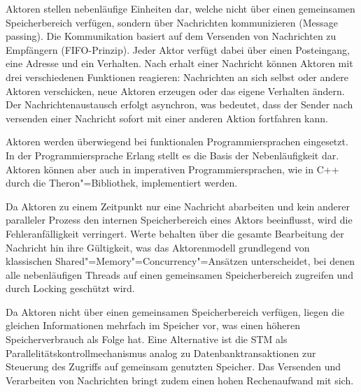 Aktoren stellen nebenläufige Einheiten dar, welche nicht über einen gemeinsamen Speicherbereich verfügen, sondern über Nachrichten kommunizieren (Message passing).
Die Kommunikation basiert auf dem Versenden von Nachrichten zu Empfängern (FIFO-Prinzip).
Jeder Aktor verfügt dabei über einen Posteingang, eine Adresse und ein Verhalten.
Nach erhalt einer Nachricht können Aktoren mit drei verschiedenen Funktionen reagieren:
Nachrichten an sich selbst oder andere Aktoren verschicken, neue Aktoren erzeugen oder das eigene Verhalten ändern.
Der Nachrichtenaustausch erfolgt asynchron, was bedeutet, dass der Sender nach versenden einer Nachricht sofort mit einer anderen Aktion fortfahren kann.


Aktoren werden überwiegend bei funktionalen Programmiersprachen eingesetzt.
In der Programmiersprache Erlang stellt es die Basis der Nebenläufigkeit dar.
Aktoren können aber auch in imperativen Programmiersprachen, wie in C++ durch die Theron"=Bibliothek, implementiert werden.

Da Aktoren zu einem Zeitpunkt nur eine Nachricht abarbeiten und kein anderer paralleler Prozess den internen Speicherbereich eines Aktors beeinflusst, wird die Fehleranfälligkeit verringert.
Werte behalten über die gesamte Bearbeitung der Nachricht hin ihre Gültigkeit, was das Aktorenmodell grundlegend von klassischen Shared"=Memory"=Concurrency"=Ansätzen unterscheidet, bei denen alle nebenläufigen Threads auf einen gemeinsamen Speicherbereich zugreifen und durch Locking geschützt wird.

Da Aktoren nicht über einen gemeinsamen Speicherbereich verfügen, liegen die gleichen Informationen mehrfach im Speicher vor, was einen höheren Speicherverbrauch als Folge hat. 
Eine Alternative ist die \ac{STM} als Parallelitätskontrollmechanismus analog zu Datenbanktransaktionen zur Steuerung des Zugriffs auf gemeinsam genutzten Speicher.
Das Versenden und Verarbeiten von Nachrichten bringt zudem einen hohen Rechenaufwand mit sich.
